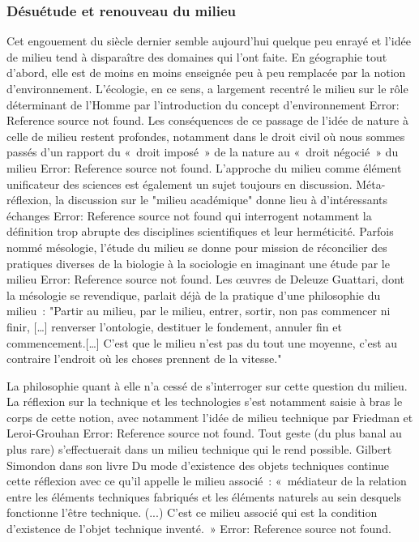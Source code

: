 \subsubsection[Désuétude et renouveau du milieu]{Désuétude et renouveau du milieu}
Cet engouement du siècle dernier semble aujourd’hui quelque peu enrayé et l’idée de milieu tend à disparaître des domaines qui l’ont faite. En géographie tout d’abord, elle est de moins en moins enseignée peu à peu remplacée par la notion d’environnement. L’écologie, en ce sens, a largement recentré le milieu sur le rôle déterminant de l’Homme par l’introduction du concept d’environnement Error: Reference source not found. Les conséquences de ce passage de l’idée de nature à celle de milieu restent profondes, notamment dans le droit civil où nous sommes passés d’un rapport du « droit imposé » de la nature au « droit négocié » du milieu Error: Reference source not found. L’approche du milieu comme élément unificateur des sciences est également un sujet toujours en discussion. Méta-réflexion, la discussion sur le "milieu académique" donne lieu à d’intéressants échanges Error: Reference source not found qui interrogent notamment la définition trop abrupte des disciplines scientifiques et leur herméticité. Parfois nommé mésologie, l’étude du milieu se donne pour mission de réconcilier des pratiques diverses de la biologie à la sociologie en imaginant une étude par le milieu Error: Reference source not found. Les œuvres de Deleuze  Guattari, dont la mésologie se revendique, parlait déjà de la pratique d’une philosophie du milieu : "Partir au milieu, par le milieu, entrer, sortir, non pas commencer ni ﬁnir, […] renverser l'ontologie, destituer le fondement, annuler ﬁn et commencement.[…] C'est que le milieu n'est pas du tout une moyenne, c'est au contraire l'endroit où les choses prennent de la vitesse."

La philosophie quant à elle n’a cessé de s’interroger sur cette question du milieu. La réflexion sur la technique et les technologies s’est notamment saisie à bras le corps de cette notion, avec notamment l’idée de milieu technique par Friedman et Leroi-Grouhan Error: Reference source not found. Tout geste (du plus banal au plus rare) s’effectuerait dans un milieu technique qui le rend possible. Gilbert Simondon dans son livre Du mode d’existence des objets techniques continue cette réflexion avec ce qu’il appelle le milieu associé : 
« médiateur de la relation entre les éléments techniques fabriqués et les éléments 	naturels au sein desquels fonctionne l’être technique. (...) C’est ce milieu associé 	qui est la condition d’existence de l’objet technique inventé. » 
Error: Reference source not found. 

